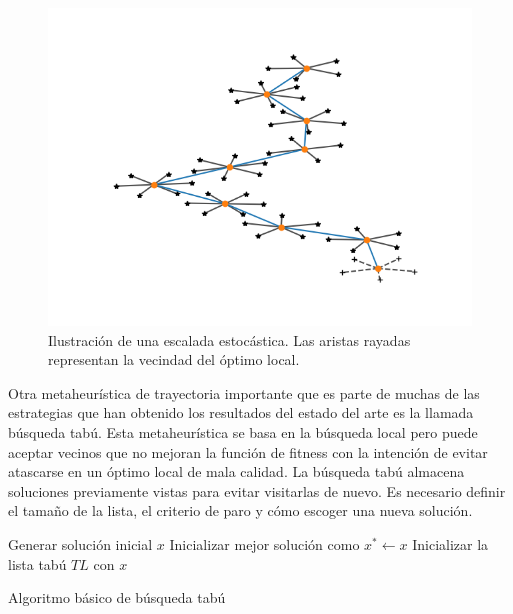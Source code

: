 \begin{figure}[H]
\centering
\includegraphics[scale=.7]{Imagenes/mettray.png}
    \caption{Ilustración de una escalada estocástica. Las aristas rayadas representan la vecindad del óptimo local.}
\end{figure}


Otra metaheurística de trayectoria importante que es parte de muchas de las estrategias que han obtenido los resultados del estado del arte es la llamada búsqueda tabú. Esta metaheurística se basa en la búsqueda local pero puede aceptar vecinos que no mejoran la función de fitness con la intención de evitar atascarse en un óptimo local de mala calidad. La búsqueda tabú almacena soluciones previamente vistas para evitar visitarlas de nuevo. Es necesario definir el tamaño de la lista, el criterio de paro y cómo escoger una nueva solución.\\ 

\begin{algorithm}[H]
 Generar solución inicial $x$\;
    Inicializar mejor solución como $x^*\leftarrow x$
 Inicializar la lista tabú $TL$ con $x$\; 
    \label{alg:TS}
    \caption{Algoritmo básico de búsqueda tabú}
\end{algorithm}

